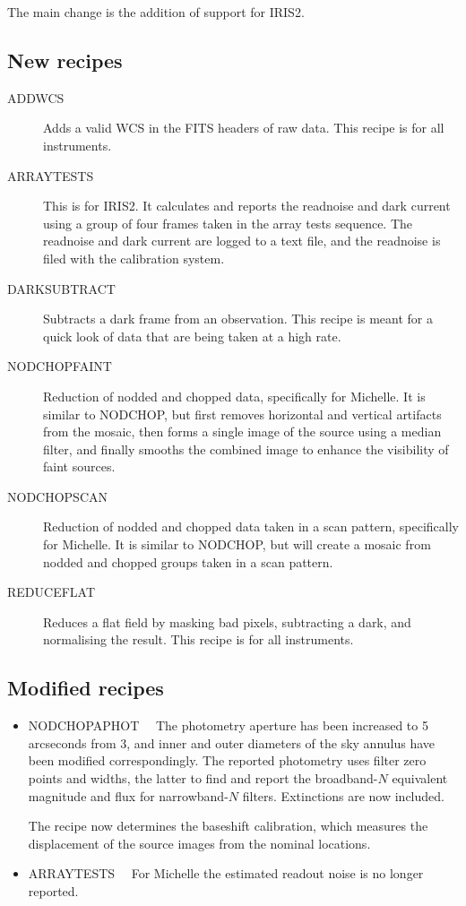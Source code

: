 \documentclass[twoside,11pt]{article}
\newcommand{\htmlref}[2]{#1}
\renewcommand{\_}{\texttt{\symbol{95}}}
\begin{document}
The main change is the addition of support for IRIS2.

\subsection{New recipes}
\begin{description}
  \item [\htmlref{ADDWCS}{ADDWCS}]
    Adds a valid WCS in the FITS headers of raw data.  This recipe
    is for all instruments.
  \item [ARRAY\_TESTS]
    This is for IRIS2.  It calculates and reports the readnoise and
    dark current using a group of four frames taken in the array
    tests sequence.  The readnoise and dark current are logged to
    a text file, and the readnoise is filed with the calibration system.
  \item [\htmlref{DARK\_SUBTRACT}{DARK\_SUBTRACT}]
    Subtracts a dark frame from an observation.  This recipe is meant
    for a quick look of data that are being taken at a high rate.
  \item [\htmlref{NOD\_CHOP\_FAINT}{NOD\_CHOP\_FAINT}]
    Reduction of nodded and chopped data, specifically for Michelle.
    It is similar to \htmlref{NOD\_CHOP}{NOD\_CHOP}, but first removes
    horizontal and vertical artifacts from the mosaic, then forms a single
    image of the source using a median filter, and finally smooths the
    combined image to enhance the visibility of faint sources.
  \item [\htmlref{NOD\_CHOP\_SCAN}{NOD\_CHOP\_SCAN}]
    Reduction of nodded and chopped data taken in a scan pattern,
    specifically for Michelle.  It is similar to NOD\_CHOP, but will
    create a mosaic from nodded and chopped groups taken in a scan
    pattern.
  \item [\htmlref{REDUCE\_FLAT}{REDUCE\_FLAT}]
    Reduces a flat field by masking bad pixels, subtracting a dark,
    and normalising the result.  This recipe is for all instruments.
\end{description}

\subsection{Modified recipes}
\begin{itemize}
  \item \htmlref{NOD\_CHOP\_APHOT}{NOD\_CHOP\_APHOT}~~
    The photometry aperture has been increased to 5 arcseconds from 3,
    and inner and outer diameters of the sky annulus have been modified
    correspondingly.  The reported photometry uses filter zero points
    and widths, the latter to find and report the broadband-$N$
    equivalent magnitude and flux for narrowband-$N$ filters. 
    Extinctions are now included.
    
    The recipe now determines the baseshift calibration, which
    measures the displacement of the source images from the nominal
    locations.

  \item \htmlref{ARRAY\_TESTS}{ARRAY\_TESTS}~~
    For Michelle the estimated readout noise is no longer reported.
\end{itemize}
\end{document}
